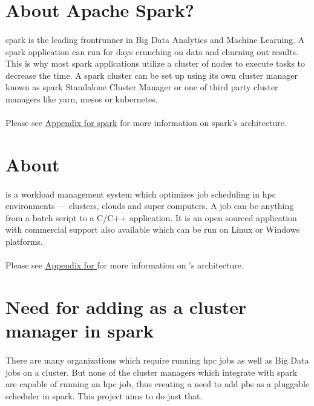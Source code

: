 
\section{About Apache Spark?}

\paragraph{} \Gls{spark} is the leading frontrunner in Big Data Analytics and
Machine Learning. A \gls{spark} application can run for days crunching on data
and churning out results. This is why most \gls{spark} applications utilize a
cluster of nodes to execute tasks to decrease the time. A \gls{spark} cluster
can be set up using its own cluster manager known as \gls{spark} Standalone
Cluster Manager or one of third party cluster managers like \gls{yarn},
\gls{mesos} or \gls{kubernetes}.

\paragraph{} Please see \hyperref[sec:appendix-spark]{Appendix for \gls{spark}}
for more information on \gls{spark}'s architecture.


\section{About }

\paragraph{}  is a workload management system which optimizes
\gls{job} scheduling in \gls{hpc} environments --- clusters, clouds and super
computers. A  job can be anything from a batch script to a C/C++
application. It is an open sourced application with commercial support also
available which can be run on Linux or Windows platforms.

\paragraph{} Please see \hyperref[sec:appendix-pbs]{Appendix for
} for more information on 's architecture.


\section{Need for adding  as a cluster manager in \gls{spark}}

\paragraph{} There are many organizations which require running \gls{hpc} jobs
as well as Big Data jobs on a cluster. But none of the cluster managers which
integrate with \gls{spark} are capable of running an \gls{hpc} job, thus
creating a need to add \gls{pbs} as a pluggable scheduler in \gls{spark}. This
project aims to do just that.
